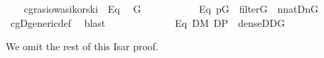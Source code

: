 \begin{isabelle}

\ \ \isamarkupfalse%
\ cg{\isachardot}rasiowa{\isacharunderscore}sikorski\ \ Eq{}\ \isamarkupfalse%
\ G\ \ \isanewline
\ \ \ \ \ \ \ \ \ Eq{}{\isacharcolon}\ {\isachardoublequoteopen}p{\isasymin}G\ {\isasymand}\ filter{\isacharparenleft}G{\isacharparenright}\ {\isasymand}\ {\isacharparenleft}{\isasymforall}n{\isasymin}nat{\isachardot}{\isacharparenleft}{\isacharquery}D{\isacharbackquote}n{\isacharparenright}{\isasyminter}G{\isasymnoteq}{}{\isacharparenright}{\isachardoublequoteclose}\isanewline
\ \ \ \ \isamarkupfalse%
\ cg{\isachardot}D{\isacharunderscore}generic{\isacharunderscore}def\ \isamarkupfalse%
\ blast\isanewline
\ \ \isamarkupfalse%
\ \isamarkupfalse%
\isanewline
\ \ \ \ \ \ \ \ \ Eq{}{\isacharcolon}\ {\isachardoublequoteopen}{\isacharparenleft}{\isasymforall}D{\isasymin}M{\isachardot}\ D{\isasymsubseteq}P\ {\isasymand}\ dense{\isacharparenleft}D{\isacharparenright}{\isasymlongrightarrow}D{\isasyminter}G{\isasymnoteq}{}{\isacharparenright}{\isachardoublequoteclose}
\end{isabelle}

\noindent We omit the rest of this Isar proof.

